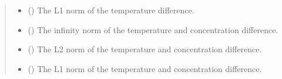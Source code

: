 \documentclass[a4paper,11pt,english,openany]{sphinxmanual}
\begin{document}
\begin{fulllineitems}
\begin{fulllineitems}
\begin{quote}
\begin{description}
\begin{itemize}
\item {} 
\sphinxAtStartPar
{} () \textendash{} The L1 norm of the temperature difference.

\item {} 
\sphinxAtStartPar
{} () \textendash{} The infinity norm of the temperature and concentration difference.

\item {} 
\sphinxAtStartPar
{} () \textendash{} The L2 norm of the temperature and concentration difference.

\item {} 
\sphinxAtStartPar
{} () \textendash{} The L1 norm of the temperature and concentration difference.

\end{itemize}

\end{description}\end{quote}

\end{fulllineitems}


\end{fulllineitems}

\end{document}
